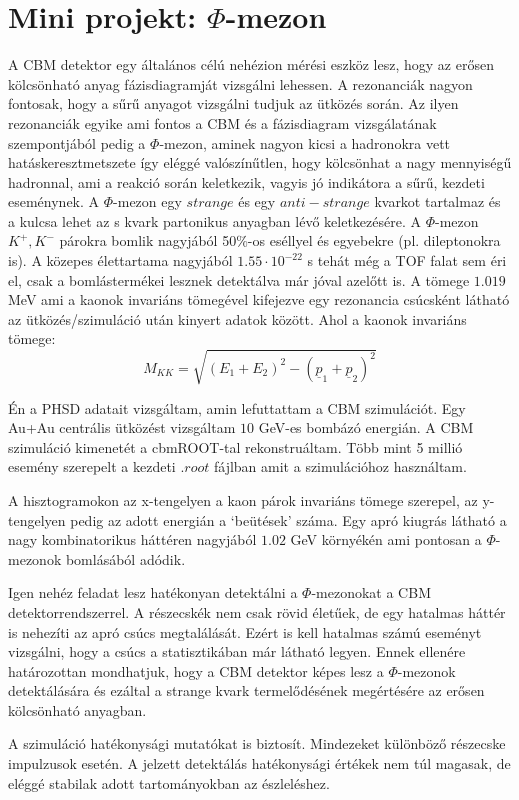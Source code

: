 \documentclass[a4paper,12pt]{article}
\begin{document}
\section{Mini projekt: $\Phi$-mezon}
\par A CBM detektor egy általános célú nehézion mérési eszköz lesz, hogy az erősen kölcsönható anyag fázisdiagramját vizsgálni lehessen. A rezonanciák nagyon fontosak, hogy a sűrű anyagot vizsgálni tudjuk az ütközés során. Az ilyen rezonanciák egyike ami fontos a CBM és a 
fázisdiagram vizsgálatának szempontjából pedig a $\Phi$-mezon, aminek nagyon kicsi a hadronokra vett hatáskeresztmetszete így eléggé valószínűtlen, hogy kölcsönhat a nagy mennyiségű hadronnal, ami a reakció során keletkezik, vagyis jó indikátora a sűrű, kezdeti eseménynek. A $\Phi$-mezon egy $strange$ és egy $anti-strange$ kvarkot tartalmaz és a kulcsa lehet az s kvark partonikus anyagban lévő keletkezésére. A $\Phi$-mezon $K^{+}, K^{-}$ párokra bomlik nagyjából 50$\%$-os eséllyel és egyebekre (pl. dileptonokra is). A közepes élettartama nagyjából $1.55\cdot10^{-22}$ s tehát még a TOF falat sem éri el, csak a bomlástermékei lesznek detektálva már jóval azelőtt is. A tömege $1.019$ MeV ami a kaonok invariáns tömegével kifejezve egy rezonancia csúcsként látható az ütközés/szimuláció után kinyert 
adatok között. Ahol a kaonok invariáns tömege:
\begin{equation*}
M_{KK} = \sqrt{(E_{1}+E_{2})^{2} - (\underline{p}_{1} + \underline{p}_{2})^{2}}
\end{equation*}
\par Én a PHSD adatait vizsgáltam, amin lefuttattam a CBM szimulációt. Egy Au+Au centrális ütközést vizsgáltam $10$ GeV-es bombázó energián.  A CBM szimuláció kimenetét a cbmROOT-tal rekonstruáltam. Több mint 5 millió esemény szerepelt a kezdeti $.root$ fájlban amit a szimulációhoz használtam.
\par A hisztogramokon az x-tengelyen a kaon párok invariáns tömege szerepel, az y-tengelyen pedig az adott energián a `beütések' száma. Egy 
apró kiugrás látható a nagy kombinatorikus háttéren nagyjából $1.02$ GeV környékén ami pontosan a $\Phi$-mezonok bomlásából adódik.
\par Igen nehéz feladat lesz hatékonyan detektálni a $\Phi$-mezonokat a CBM detektorrendszerrel. A részecskék nem csak rövid életűek, de egy hatalmas háttér is nehezíti az apró csúcs megtalálását. Ezért is kell hatalmas számú eseményt vizsgálni, hogy a csúcs
a statisztikában már látható legyen. Ennek ellenére határozottan mondhatjuk, hogy a CBM detektor képes lesz a $\Phi$-mezonok detektálására és ezáltal a strange kvark termelődésének megértésére az erősen kölcsönható anyagban.
\par A szimuláció hatékonysági mutatókat is biztosít. Mindezeket különböző részecske impulzusok esetén. A jelzett detektálás hatékonysági értékek nem túl magasak, de eléggé stabilak adott tartományokban az észleléshez.
\end{document}
